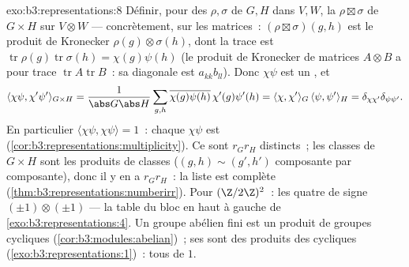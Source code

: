 \begin{solution}{exo:b3:representations:8}
Définir, pour des  $\rho, \sigma$ de $G, H$ dans
$V, W$, la  $\rho \boxtimes \sigma$ de $G \times
H$ sur $V \otimes W$ --- concrètement, sur les matrices~:
$(\rho\boxtimes \sigma)(g,h)$ est le produit de Kronecker
$\rho(g)\otimes \sigma(h)$, dont la trace est
$\operatorname{tr}\rho(g)\operatorname{tr}\sigma(h) =
\chi(g)\psi(h)$ (le produit de Kronecker de matrices $A \otimes
B$ a pour trace $\operatorname{tr}A\operatorname{tr}B$~: sa
diagonale est $a_{kk}b_{ll}$). Donc $\chi\psi$ est un ,
et
\[
\langle\chi\psi, \chi'\psi'\rangle_{G\times H}
= \frac{1}{\abs G\abs H}\sum_{g,h}
\overline{\chi(g)\psi(h)}\,\chi'(g)\psi'(h)
= \langle\chi,\chi'\rangle_G\,\langle\psi,\psi'\rangle_H
= \delta_{\chi\chi'}\delta_{\psi\psi'}.
\]
En particulier $\langle\chi\psi,\chi\psi\rangle = 1$~: chaque
$\chi\psi$ est 
(\cref{cor:b3:representations:multiplicity}). Ce sont $r_Gr_H$
  distincts~; les classes de $G\times H$
sont les produits de classes ($(g,h) \sim (g',h')$
composante par composante), donc il y en a $r_Gr_H$~: la liste
est complète (\cref{thm:b3:representations:numberirr}). Pour
$(\Z/2\Z)^2$~: les quatre  de signe
$(\pm1)\otimes(\pm1)$ --- la table du bloc en haut à gauche de
\cref{exo:b3:representations:4}. Un groupe abélien fini est un
produit de groupes cycliques
(\cref{cor:b3:modules:abelian})~; ses  
sont des produits des cycliques
(\cref{exo:b3:representations:1})~: tous de  $1$.
\end{solution}

